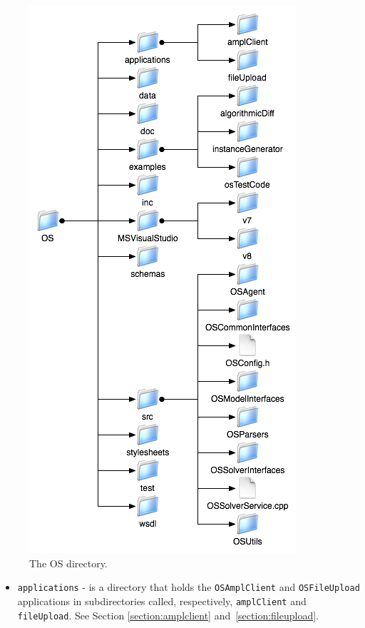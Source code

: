 \documentclass[11pt]{article}
\newcommand{\figurepath}{./figures}
\renewcommand{\_}{{\char"5F}}
\renewcommand{\{}{{\char"7B}}
\renewcommand{\}}{{\char"7D}}
\renewcommand{\^}{{\char"0D}}
\renewcommand{\'}{{\char"0D}}
\begin{document}
\begin{enumerate}[Step 1:]
\begin{figure}
\centering
\includegraphics[scale=0.8]{./figures/OSDirectory.png}
\caption{The OS directory.}
\label{figure:osdirectory}
\end{figure}



\begin{itemize}


\item {\tt applications} - is a directory that holds  the {\tt OSAmplClient}
and {\tt OSFileUpload}  applications in subdirectories called, respectively, {\tt amplClient} and {\tt fileUpload}.
See Section \ref{section:amplclient} and~\ref{section:fileupload}.


\end{itemize}
\end{enumerate}
\end{document}
